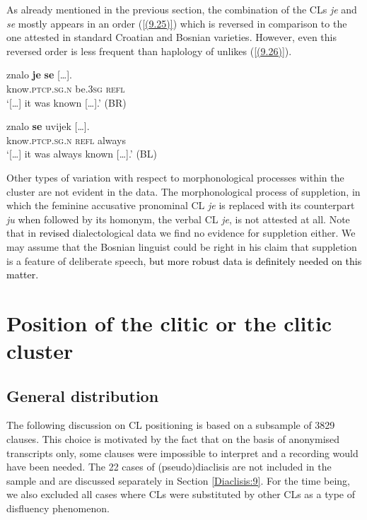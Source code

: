 As already mentioned in the previous section, the combination of the CLs \textit{je} and \textit{se} mostly appears in an order (\ref{(9.25)}) which is reversed in comparison to the one attested in standard Croatian and Bosnian varieties. However, even this reversed order is less frequent than haplology of unlikes (\ref{(9.26)}).

\begin{exe}\ex\label{(9.25)}
\gll  [\dots] znalo \textbf{je} {\textbf{se}  [\dots].} \\
{} know.\textsc{ptcp}.\textsc{sg}.\textsc{n} be.3\textsc{sg}  \textsc{refl}  \\
\glt ‘[\dots] it was known  [\dots].’
\hfill (BR)

\ex\label{(9.26)}
\gll  [\dots] znalo \textbf{se} {uvijek  [\dots].} \\
{} know.\textsc{ptcp}.\textsc{sg}.\textsc{n} \textsc{refl}  always \\
\glt ‘[\dots] it was always known  [\dots].’
\hfill (BL)
\end{exe}

\noindent Other types of variation with respect to morphonological processes within the cluster are not evident in the data. The morphonological process of suppletion, in which the feminine accusative pronominal CL \textit{je} is replaced with its counterpart \textit{ju} when followed by its homonym, the verbal CL \textit{je}, is not attested at all. Note that in \textcolor{black}{revised} dialectological data we find no evidence for suppletion either. We may assume that the Bosnian linguist \citet[434]{Ridjanovic12} could be right in his claim that suppletion is a feature of deliberate speech, \textcolor{black}{but more robust data is definitely needed on this matter.} 

\section{Position of the clitic or the clitic cluster}
\label{Positioning of single clitics and clitic clusters}
\subsection{General distribution}

The following discussion on CL positioning is based on a subsample of 3829 clauses. This choice is motivated by the fact that on the basis of anonymised transcripts only, some clauses were impossible to interpret and a recording would have been needed. The 22 cases of (pseudo)diaclisis are not included in the sample and are discussed separately in Section \ref{Diaclisis:9}. For the time being, we also excluded all cases where CLs were substituted by other CLs as a type of disfluency phenomenon.

